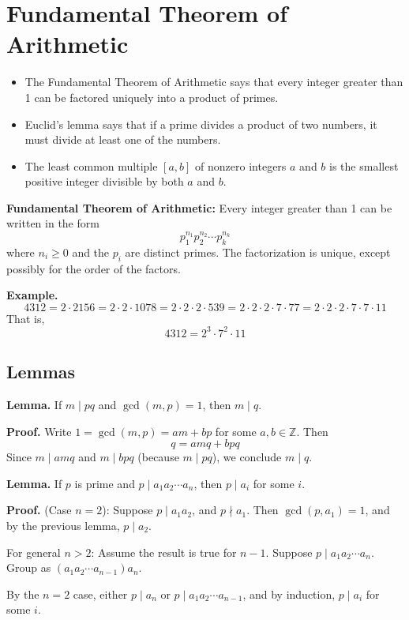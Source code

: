 \section{Fundamental Theorem of Arithmetic}

\begin{itemize}
	\item The Fundamental Theorem of Arithmetic says that every integer greater than 1 can be factored uniquely into a product of primes.
	\item Euclid’s lemma says that if a prime divides a product of two numbers, it must divide at least one of the numbers.
	\item The least common multiple $[a, b]$ of nonzero integers $a$ and $b$ is the smallest positive integer divisible by both $a$ and $b$.
\end{itemize}

\textbf{Fundamental Theorem of Arithmetic:}
Every integer greater than 1 can be written in the form
\[
	p_1^{n_1}p_2^{n_2} \cdots p_k^{n_k}
\]
where $n_i \geq 0$ and the $p_i$ are distinct primes. The factorization is unique, except possibly for the order of the factors.

\textbf{Example.}
\[
	4312 = 2 \cdot 2156 = 2 \cdot 2 \cdot 1078 = 2 \cdot 2 \cdot 2 \cdot 539 = 2 \cdot 2 \cdot 2 \cdot 7 \cdot 77 = 2 \cdot 2 \cdot 2 \cdot 7 \cdot 7 \cdot 11
\]
That is,
\[
	4312 = 2^3 \cdot 7^2 \cdot 11
\]

\subsection{Lemmas}

\textbf{Lemma.} If $m \mid pq$ and $\gcd(m, p) = 1$, then $m \mid q$.

\textbf{Proof.} Write $1 = \gcd(m, p) = am + bp$ for some $a, b \in \mathbb{Z}$.
Then
\[
	q = amq + bpq
\]
Since $m \mid amq$ and $m \mid bpq$ (because $m \mid pq$), we conclude $m \mid q$.

\bigskip

\textbf{Lemma.} If $p$ is prime and $p \mid a_1a_2 \cdots a_n$, then $p \mid a_i$ for some $i$.

\textbf{Proof.} (Case $n=2$): Suppose $p \mid a_1a_2$, and $p \nmid a_1$.
Then $\gcd(p, a_1) = 1$, and by the previous lemma, $p \mid a_2$.

For general $n > 2$: Assume the result is true for $n-1$. Suppose $p \mid a_1a_2 \cdots a_n$.
Group as $(a_1a_2 \cdots a_{n-1})a_n$.

By the $n=2$ case, either $p \mid a_n$ or $p \mid a_1a_2 \cdots a_{n-1}$, and by induction, $p \mid a_i$ for some $i$.

